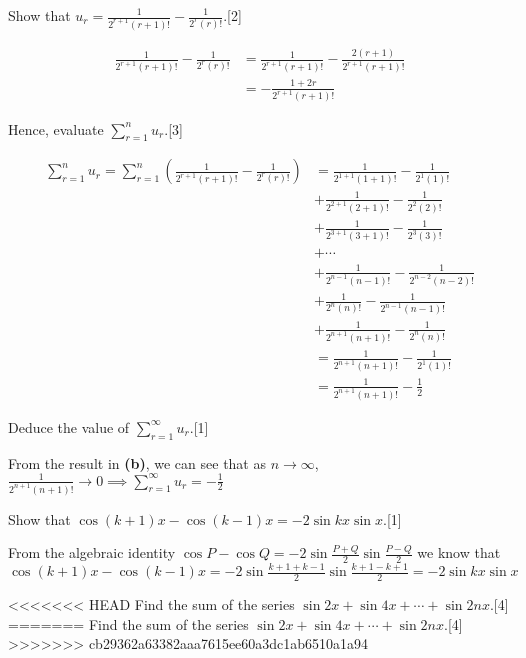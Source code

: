 \documentclass[12pt, a4 paper]{article}
\begin{document}
\begin{outline}[enumerate]
 \2 Show that \(u_{r}=\frac{1}{2^{r+1}(r+1)!}-\frac{1}{2^{r}(r)!}\).\hfill[2]
\begin{answer}
  \begin{align*}
    \frac{1}{2^{r+1}(r+1)!}-\frac{1}{2^{r}(r)!} &= \frac{1}{2^{r+1}(r+1)!}-\frac{2(r+1)}{2^{r+1}(r+1)!} \\
    &= -\frac{1+2r}{2^{r+1}(r+1)!}
  \end{align*}
\end{answer}
 \2 Hence, evaluate \(\sum\limits_{r=1}^{n}u_r\).\hfill[3]
\begin{answer}
  \begin{align*}
    \sum\limits_{r=1}^{n}u_r = \sum\limits_{r=1}^{n}\left(\frac{1}{2^{r+1}(r+1)!}-\frac{1}{2^{r}(r)!}\right) &= \frac{1}{2^{1+1}(1+1)!}-\frac{1}{2^{1}(1)!} \\
    & +\frac{1}{2^{2+1}(2+1)!}-\frac{1}{2^{2}(2)!} \\
    & +\frac{1}{2^{3+1}(3+1)!}-\frac{1}{2^{3}(3)!} \\
    & +\cdots \\
    & +\frac{1}{2^{n-1}(n-1)!}-\frac{1}{2^{n-2}(n-2)!} \\
    & +\frac{1}{2^{n}(n)!}-\frac{1}{2^{n-1}(n-1)!} \\
    & +\frac{1}{2^{n+1}(n+1)!}-\frac{1}{2^{n}(n)!} \\
    &= \frac{1}{2^{n+1}(n+1)!} - \frac{1}{2^{1}(1)!} \\
    &= \frac{1}{2^{n+1}(n+1)!} - \frac{1}{2}
  \end{align*}
\end{answer}
 \2 Deduce the value of \(\sum\limits_{r=1}^{\infty}u_r\).\hfill[1]
 \begin{answer}
   From the result in \textbf{(b)}, we can see that as \(n \to
   \infty \), \(\frac{1}{2^{n+1}(n+1)!} \to 0 \implies \sum\limits_{r=1}^{\infty}u_r = -\frac{1}{2}\)
 \end{answer}
 \1
 \2 Show that \(\cos{(k+1)}x-\cos{(k-1)x}=-2\sin{kx}\sin{x}\).\hfill[1]
\begin{answer}
  From the algebraic identity \(\cos P - \cos Q = -2\sin\frac{P+Q}{2}\sin\frac{P-Q}{2}\) we know that \(\cos{(k+1)}x-\cos{(k-1)x} = -2\sin\frac{k+1+k-1}{2}\sin\frac{k+1-k+1}{2} = -2\sin{kx}\sin x\)
\end{answer}
<<<<<<< HEAD
 \2 Find the sum of the series \(\sin{2x}+\sin{4x}+\cdots+\sin{2nx}\).\hfill[4]%
=======
 \2 Find the sum of the series \(\sin{2x}+\sin{4x}+\cdots+\sin{2nx}\).\hfill[4]%
>>>>>>> cb29362a63382aaa7615ee60a3dc1ab6510a1a94

\end{outline}
\end{document}
